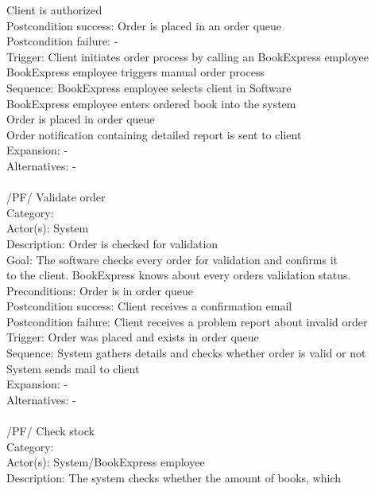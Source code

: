 \documentclass[11pt,a4paper,oneside,svgnames]{report}
\begin{document}
\begin{tabbing}
	 \> Client is authorized\\
	 Postcondition success: \> Order is placed in an order queue\\
	 Postcondition failure: \> -\\
	 Trigger: \> Client initiates order process by calling an BookExpress employee\\
	 \> BookExpress employee triggers manual order process\\
	 Sequence: \> BookExpress employee selects client in Software\\
	 \> BookExpress employee enters ordered book into the system\\
	 \> Order is placed in order queue\\
	 \> Order notification containing detailed report is sent to client\\
	 Expansion: \> -\\
	 Alternatives: \> -\\
	 \\
	 /PF/ \> Validate order\\ 
	 Category: \> \\
	 Actor(s): \> System\\ 
	 Description: \> Order is checked for validation\\ 
	 Goal: \> The software checks every order for validation and confirms it\\
	 \> to the client. BookExpress knows about every orders validation status.\\
	 Preconditions: \> Order is in order queue\\
	 Postcondition success: \> Client receives a confirmation email\\
	 Postcondition failure: \> Client receives a problem report about invalid order\\
	 Trigger: \> Order was placed and exists in order queue\\
	 Sequence: \> System  gathers details and checks whether order is valid or not\\
	 \> System sends mail to client\\
	 Expansion: \> -\\
	 Alternatives: \> -\\
	 \\
	 /PF/ \> Check stock\\ 
	 Category: \> \\
	 Actor(s): \> System/BookExpress employee\\ 
	 Description: \> The system checks whether the amount of books, which\\

\end{tabbing}
\end{document}
